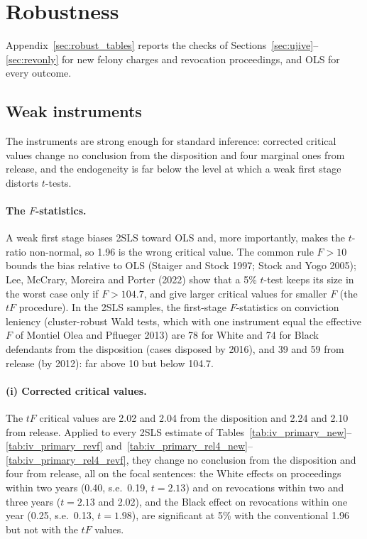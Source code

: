 \documentclass[11pt]{article}
\begin{document}
\section{Robustness}\label{sec:robust}

Appendix~\ref{sec:robust_tables} reports the checks of Sections~\ref{sec:ujive}--\ref{sec:revonly} for new felony charges and revocation proceedings, and OLS for every outcome.

\subsection{Weak instruments}\label{sec:weak}

The instruments are strong enough for standard inference: corrected critical values change no conclusion from the disposition and four marginal ones from release, and the endogeneity is far below the level at which a weak first stage distorts $t$-tests.

\paragraph{The $F$-statistics.} A weak first stage biases 2SLS toward OLS and, more importantly, makes the $t$-ratio non-normal, so 1.96 is the wrong critical value. The common rule $F > 10$ bounds the bias relative to OLS (Staiger and Stock 1997; Stock and Yogo 2005); Lee, McCrary, Moreira and Porter (2022) show that a 5\% $t$-test keeps its size in the worst case only if $F > 104.7$, and give larger critical values for smaller $F$ (the $tF$ procedure). In the 2SLS samples, the first-stage $F$-statistics on conviction leniency (cluster-robust Wald tests, which with one instrument equal the effective $F$ of Montiel Olea and Pflueger 2013) are 78 for White and 74 for Black defendants from the disposition (cases disposed by 2016), and 39 and 59 from release (by 2012): far above 10 but below 104.7.

\paragraph{(i) Corrected critical values.} The $tF$ critical values are 2.02 and 2.04 from the disposition and 2.24 and 2.10 from release. Applied to every 2SLS estimate of Tables~\ref{tab:iv_primary_new}--\ref{tab:iv_primary_revf} and~\ref{tab:iv_primary_rel4_new}--\ref{tab:iv_primary_rel4_revf}, they change no conclusion from the disposition and four from release, all on the focal sentences: the White effects on proceedings within two years (0.40, s.e.\ 0.19, $t = 2.13$) and on revocations within two and three years ($t = 2.13$ and 2.02), and the Black effect on revocations within one year (0.25, s.e.\ 0.13, $t = 1.98$), are significant at 5\% with the conventional 1.96 but not with the $tF$ values.
\end{document}
